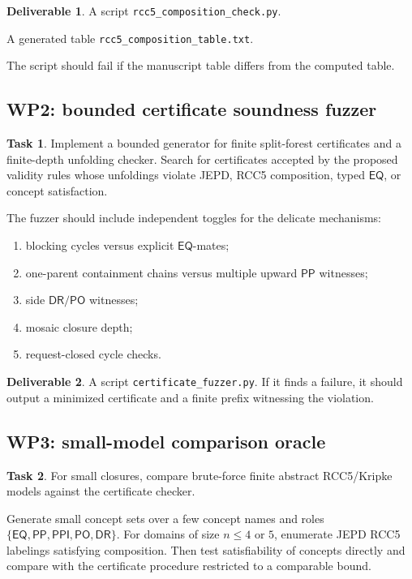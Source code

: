\documentclass[11pt]{article}
\newcommand{\EQ}{\mathsf{EQ}}
\newcommand{\PP}{\mathsf{PP}}
\newcommand{\PPI}{\mathsf{PPI}}
\newcommand{\PO}{\mathsf{PO}}
\newcommand{\DR}{\mathsf{DR}}
\theoremstyle{definition}
\newtheorem{task}{Task}
\newtheorem{deliverable}{Deliverable}
\theoremstyle{plain}
\begin{document}
\begin{deliverable}
A script \texttt{rcc5\_composition\_check.py}.\par A generated table \texttt{rcc5\_composition\_table.txt}.\par The script should fail if the manuscript table differs from the computed table.
\end{deliverable}

\subsection{WP2: bounded certificate soundness fuzzer}

\begin{task}
Implement a bounded generator for finite split-forest certificates and a finite-depth unfolding checker.  Search for certificates accepted by the proposed validity rules whose unfoldings violate JEPD, RCC5 composition, typed \(\EQ\), or concept satisfaction.
\end{task}

The fuzzer should include independent toggles for the delicate mechanisms:
\begin{enumerate}[label=(\alph*)]
  \item blocking cycles versus explicit \(\EQ\)-mates;
  \item one-parent containment chains versus multiple upward \(\PP\) witnesses;
  \item side \(\DR/\PO\) witnesses;
  \item mosaic closure depth;
  \item request-closed cycle checks.
\end{enumerate}

\begin{deliverable}
A script \texttt{certificate\_fuzzer.py}.  If it finds a failure, it should output a minimized certificate and a finite prefix witnessing the violation.
\end{deliverable}

\subsection{WP3: small-model comparison oracle}

\begin{task}
For small closures, compare brute-force finite abstract RCC5/Kripke models against the certificate checker.
\end{task}

Generate small concept sets over a few concept names and roles \(\{\EQ,\PP,\PPI,\PO,\DR\}\).  For domains of size \(n\leq 4\) or \(5\), enumerate JEPD RCC5 labelings satisfying composition.  Then test satisfiability of concepts directly and compare with the certificate procedure restricted to a comparable bound.
\end{document}
